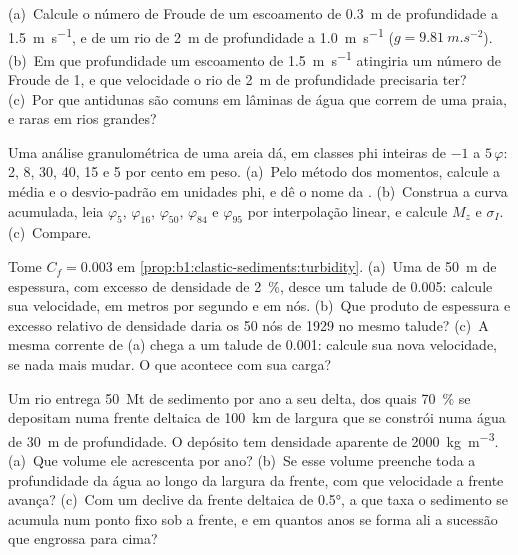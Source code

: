 \begin{exercise}[$\star\star$]\label{exo:b1:clastic-sediments:9}
(a)~Calcule o número de Froude de um escoamento de \qty{0.3}{m} de profundidade a \qty{1.5}{m.s^{-1}}, e de um rio de \qty{2}{m} de profundidade a \qty{1.0}{m.s^{-1}} ($g
= \qty{9.81}{m.s^{-2}}$). (b)~Em que profundidade um escoamento de \qty{1.5}{m.s^{-1}} atingiria um número de Froude de 1, e que velocidade o rio de \qty{2}{m} de profundidade precisaria ter? (c)~Por que antidunas são comuns em lâminas de água que correm
de uma praia, e raras em rios grandes?
\end{exercise}

\begin{exercise}[$\star\star\star$]\label{exo:b1:clastic-sediments:10}
Uma análise granulométrica de uma areia dá, em classes phi inteiras de $-1$ a $5\,\varphi$: 2, 8, 30, 40, 15 e 5 por cento em peso. (a)~Pelo método dos momentos, calcule a média e o desvio-padrão em unidades phi, e dê o nome da . (b)~Construa a curva acumulada, leia $\varphi_5$, $\varphi_{16}$, $\varphi_{50}$, $\varphi_{84}$ e $\varphi_{95}$ por interpolação linear, e calcule $M_z$ e $\sigma_I$. (c)~Compare.
\end{exercise}

\begin{exercise}[$\star\star\star$]\label{exo:b1:clastic-sediments:11}
Tome $C_f = 0.003$ em \cref{prop:b1:clastic-sediments:turbidity}. (a)~Uma  de \qty{50}{m} de espessura, com excesso de densidade de \qty{2}{\percent}, desce um talude de \num{0.005}: calcule sua velocidade, em metros por segundo e em nós. (b)~Que produto de espessura e excesso relativo de densidade daria os 50 nós de 1929 no mesmo talude? (c)~A mesma corrente de (a) chega a um talude de \num{0.001}: calcule sua nova velocidade, se nada mais mudar. O que acontece com sua carga?
\end{exercise}

\begin{exercise}[$\star\star\star$]\label{exo:b1:clastic-sediments:12}
Um rio entrega \qty{50}{Mt} de sedimento por ano a seu delta, dos quais \qty{70}{\percent} se depositam numa frente deltaica de \qty{100}{km} de largura que se constrói numa água de \qty{30}{m} de profundidade. O depósito tem densidade aparente de \qty{2000}{kg.m^{-3}}. (a)~Que volume ele acrescenta por ano? (b)~Se esse volume preenche toda a profundidade da água ao longo da largura da frente, com que velocidade a frente avança? (c)~Com um declive da frente deltaica de \ang{0.5}, a que taxa o sedimento se acumula num ponto fixo sob a frente, e em quantos anos se forma ali a sucessão que engrossa para cima?
\end{exercise}

